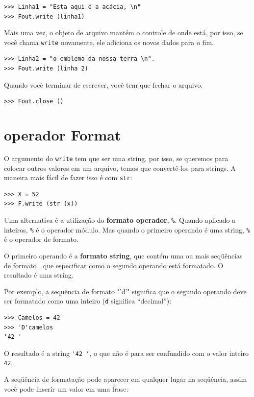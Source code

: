\documentclass[10pt]{book}
\begin{document}
\begin{exercise}
\begin{v erbatim}
\begin{verbatim}
>>> Linha1 = "Esta aqui é a acácia, \n"
>>> Fout.write (linha1)
\end{verbatim}
%
Mais uma vez, o objeto de arquivo mantém o controle de onde está, por isso, se
você chama {\tt write} novamente, ele adiciona os novos dados para o fim.

\begin{verbatim}
>>> Linha2 = "o emblema da nossa terra \n".
>>> Fout.write (linha 2)
\end{verbatim}
%
Quando você terminar de escrever, você tem que fechar o arquivo.

\begin{verbatim}
>>> Fout.close ()
\end{verbatim}
%


\section{operador Format}

O argumento do {\tt write} tem que ser uma string, por isso, se queremos
para colocar outros valores em um arquivo, temos que convertê-los para
strings. A maneira mais fácil de fazer isso é com {\tt str}:

\begin{verbatim}
>>> X = 52
>>> F.write (str (x))
\end{verbatim}
%
Uma alternativa é a utilização do {\bf formato operador}, {\tt \%}. Quando
aplicado a inteiros, {\tt \%} é o operador módulo. Mas
quando o primeiro operando é uma string, {\tt \%} é o operador de formato.

O primeiro operando é a {\bf formato string}, que contém
uma ou mais seqüências de formato {\bf}, que
especificar como
o segundo operando está formatado. O resultado é uma string.

Por exemplo, a sequência de formato \verbo "'d'" significa que
o segundo operando deve ser formatado como uma
inteiro ({\tt d} significa ``decimal''):

\begin{verbatim}
>>> Camelos = 42
>>> 'D'camelos
'42 '
\end{verbatim}
%
O resultado é a string \verb "'42 '", o que não é para ser confundido
com o valor inteiro {\tt 42}.

A seqüência de formatação pode aparecer em qualquer lugar na seqüência,
assim você pode inserir um valor em uma frase:


\end{v erbatim}
\end{exercise}
\end{document}
